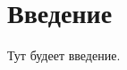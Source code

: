 \documentclass[twoside,a4paper]{msmb} %
\begin{document}
\section*{Введение} %
Тут будеет введение.

\begin{thebibliography}{99}

\end{thebibliography}

\endarticle  %
\end{document}
